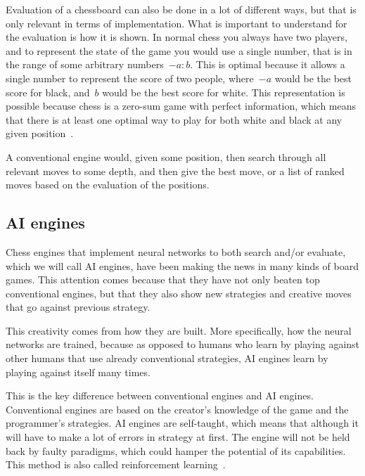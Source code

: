 
Evaluation of a chessboard can also be done in a lot of different ways, but that is only relevant in terms of
implementation.
What is important to understand for the evaluation is how it is shown.
In normal chess you always have two players, and to represent the state of the game you would use a single number,
that is in the range of some arbitrary numbers~\( -a : b\).
This is optimal because it allows a single number to represent the score of two people, where~\(-a\) would be
the best score for black, and~\(b\) would be the best score for white.
This representation is possible because chess is a zero-sum game with perfect information, which means that there is
at least one optimal way to play for both white and black at any given position~\cite{zero-sum-games}.


A conventional engine would, given some position, then search through all relevant moves to some depth, and then give
the best move, or a list of ranked moves based on the evaluation of the positions.

\subsection{AI engines}\label{subsec:ai-engines}

Chess engines that implement neural networks to both search and/or evaluate, which we will call AI engines,
have been making the news in many kinds of board games.
This attention comes because that they have not only beaten top conventional engines,
but that they also show new strategies and creative moves that go against previous strategy.

This creativity comes from how they are built.
More specifically, how the neural networks are trained, because as opposed to humans who learn by playing against other
humans that use already conventional strategies, AI engines learn by playing against itself many times.

This is the key difference between conventional engines and AI engines.
Conventional engines are based on the creator's knowledge of the game and the programmer's strategies.
AI engines are self-taught, which means that although it will have to make a lot of errors in strategy at first.
The engine will not be held back by faulty paradigms, which could hamper the potential of its
capabilities.
This method is also called reinforcement learning~\cite{how-neural-network-engines-work}.


